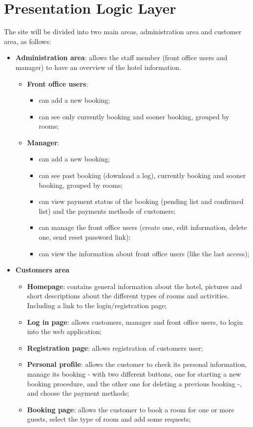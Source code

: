 \section{Presentation Logic Layer}
The site will be divided into two main areas, administration area and customer area, as follows:
\begin{itemize}
    \item \textbf{Administration area}: allows the staff member (front office users and manager) to have an overview of the hotel information.
    	\begin{itemize}
    			 \item \textbf{Front office users}: 
    			 \begin{itemize}
    			 	\item can add a new booking;
					\item can see only currently booking and sooner booking, grouped by rooms;
    			 \end{itemize}
    			 \item \textbf{Manager}: 
				\begin{itemize}
					\item can add a new booking;
					\item can see past booking (download a log), currently booking and sooner booking, grouped by rooms;
					\item can view payment status of the booking (pending list and confirmed list) and the payments methods of customers;
					\item can manage the front office users (create one, edit information, delete one, send reset password link);
					\item can view the information about front office users (like the last access);
				\end{itemize}    			 
    	\end{itemize}
    \item \textbf{Customers area}
    \begin{itemize}
	    \item \textbf{Homepage}: contains general information about the hotel, pictures and short descriptions about the different types of rooms and activities. Including a link to the login/registration page;
	    \item \textbf{Log in page}: allows customers, manager and front office users, to login into the web application;
	    \item \textbf{Registration page}: allows registration of customers user;
	    \item \textbf{Personal profile}: allows the customer to check its personal information, manage its booking - with two different buttons, one for starting a new booking procedure, and the other one for deleting a previous booking -, and choose the payment methods; 
	    \item \textbf{Booking page}: allows the customer to book a room for one or more guests, select the type of room and add some requests;
    \end{itemize}
  
\end{itemize}
\pagebreak
